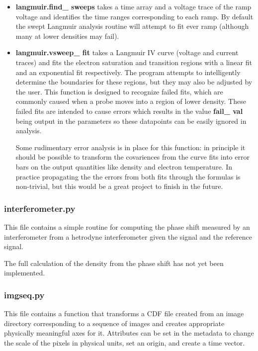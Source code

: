 \documentclass[12pt]{article}
\newcommand{\loc}[1]{{\bf \fontfamily{pcr}\selectfont #1}}
\newcommand{\todo}[1]{ \begin{tcolorbox} \centering  #1 \end{tcolorbox}}
\begin{document}
\begin{itemize}

\item \loc{langmuir.find\_ sweeps} takes a time array and a voltage trace of the ramp voltage and identifies the time ranges corresponding to each ramp. By default the swept Langmuir analysis routine will attempt to fit ever ramp (although many at lower densities may fail). 

\item \loc{langmuir.vsweep\_ fit} takes a Langmuir IV curve (voltage and current traces) and fits the electron saturation and transition regions with a linear fit and an exponential fit respectively. The program attempts to intelligently determine the boundaries for these regions, but they may also be adjusted by the user. This function is designed to recognize failed fits, which are commonly caused when a probe moves into a region of lower density. These failed fits are intended to cause errors which results in the value \loc{fail\_ val} being output in the parameters so these datapoints can be easily ignored in analysis.

\todo{Some rudimentary error analysis is in place for this function: in principle it should be possible to transform the covariences from the curve fits into error bars on the output quantities like density and electron temperature. In practice propagating the the errors from both fits through the formulas is non-trivial, but this would be a great project to finish in the future.}

\end{itemize}


\subsubsection{\loc{interferometer.py}}

This file contains a simple routine for computing the phase shift measured by an interferometer from a hetrodyne interferometer given the signal and the reference signal. 

\todo{The full calculation of the density from the phase shift has not yet been implemented.}

\subsubsection{\loc{imgseq.py}}

This file contains a function that transforms a CDF file created from an image directory corresponding to a sequence of images and creates appropriate physically meaningful axes for it. Attributes can be set in the metadata to change the scale of the pixels in physical units, set an origin, and create a time vector. 
\end{document}
